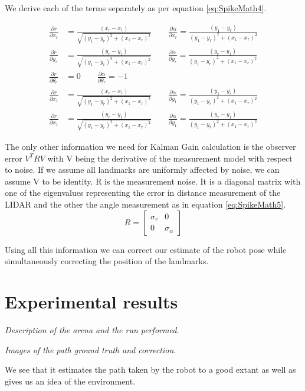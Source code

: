 We derive each of the terms separately as per equation \ref{eq:SpikeMath4}. 

\begin{subequations}
\label{eq:SpikeMath4}
	\begin{align}
	\frac{\partial r}{\partial x_r} &= \frac{(x_r-x_1)}{\sqrt{(y_1-y_r)^2+(x_1-x_r)^2}} \qquad
	\frac{\partial \alpha}{\partial x_r} =  
	\frac{(y_1-y_r)}{(y_1-y_r)^2+(x_1-x_r)^2} \\
	\frac{\partial r}{\partial y_r} &= \frac{(y_r-y_1)}{\sqrt{(y_1-y_r)^2+(x_1-x_r)^2}} \qquad
	\frac{\partial \alpha}{\partial y_r} =  
	\frac{(y_r-y_1)}{(y_1-y_r)^2+(x_1-x_r)^2} \\
	\frac{\partial r}{\partial \theta_r} &= 0 \qquad  
	\frac{\partial \alpha}{\partial \theta_r} = -1\\
	\frac{\partial r}{\partial x_1} &= \frac{(x_r-x_1)}{\sqrt{(y_1-y_r)^2+(x_1-x_r)^2}} \qquad
	\frac{\partial \alpha}{\partial y_1} =  
	\frac{(y_1-y_r)}{(y_1-y_r)^2+(x_1-x_r)^2} \\
	\frac{\partial r}{\partial x_1} &= \frac{(y_r-y_1)}{\sqrt{(y_1-y_r)^2+(x_1-x_r)^2}} \qquad
	\frac{\partial \alpha}{\partial y_1} =  
	\frac{(y_r-y_1)}{(y_1-y_r)^2+(x_1-x_r)^2}	
	\end{align}
\end{subequations}

The only other information we need for Kalman Gain calculation is the observer error $ V^TRV $ with V being the derivative of the measurement model with respect to noise. If we assume all landmarks are uniformly affected by noise, we can assume V to be identity. R is the measurement noise. It is a diagonal matrix with one of the eigenvalues representing the error in distance measurement of the LIDAR and the other the angle measurement as in equation \ref{eq:SpikeMath5}. 
\begin{equation}
\label{eq:SpikeMath5}
R = 
\begin{bmatrix}
\sigma_r & 0 \\
0 & \sigma_\alpha
\end{bmatrix}
\end{equation}

Using all this information we can correct our estimate of the robot pose while simultaneously correcting the position of the landmarks. 
\section{Experimental results}
\label{sec:Spike_results}
\textit{Description of the arena and the run performed.}

\textit{Images of the path ground truth and correction.}

We see that it estimates the path taken by the robot to a good extant as well as gives us an idea of the environment.
 